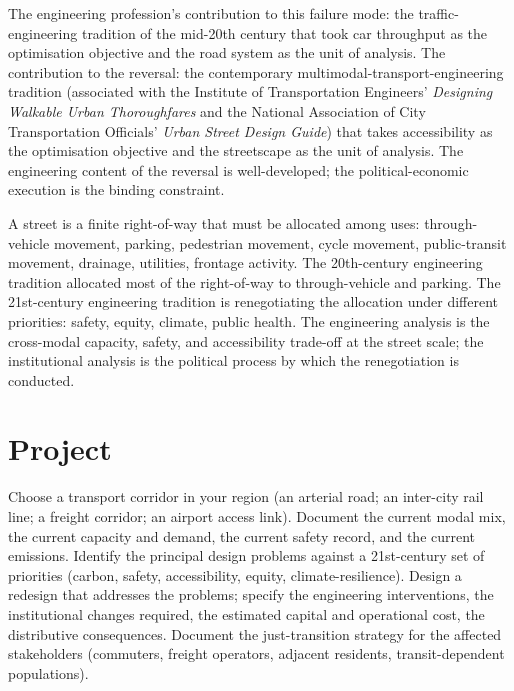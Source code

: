 The engineering profession's contribution to this failure mode: the traffic-engineering tradition of the mid-20th century that took car throughput as the optimisation objective and the road system as the unit of analysis. The contribution to the reversal: the contemporary multimodal-transport-engineering tradition (associated with the Institute of Transportation Engineers' \emph{Designing Walkable Urban Thoroughfares} and the National Association of City Transportation Officials' \emph{Urban Street Design Guide}) that takes accessibility as the optimisation objective and the streetscape as the unit of analysis. The engineering content of the reversal is well-developed; the political-economic execution is the binding constraint.

\begin{principle}
A street is a finite right-of-way that must be allocated among uses: through-vehicle movement, parking, pedestrian movement, cycle movement, public-transit movement, drainage, utilities, frontage activity. The 20th-century engineering tradition allocated most of the right-of-way to through-vehicle and parking. The 21st-century engineering tradition is renegotiating the allocation under different priorities: safety, equity, climate, public health. The engineering analysis is the cross-modal capacity, safety, and accessibility trade-off at the street scale; the institutional analysis is the political process by which the renegotiation is conducted.
\end{principle}

\section{Project}

\begin{project}
Choose a transport corridor in your region (an arterial road; an inter-city rail line; a freight corridor; an airport access link). Document the current modal mix, the current capacity and demand, the current safety record, and the current emissions. Identify the principal design problems against a 21st-century set of priorities (carbon, safety, accessibility, equity, climate-resilience). Design a redesign that addresses the problems; specify the engineering interventions, the institutional changes required, the estimated capital and operational cost, the distributive consequences. Document the just-transition strategy for the affected stakeholders (commuters, freight operators, adjacent residents, transit-dependent populations).
\end{project}

